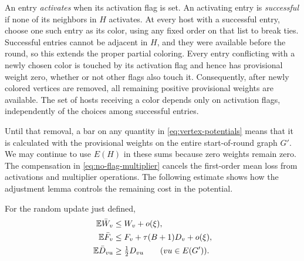 An entry \emph{activates} when its activation flag is set.  An activating
entry is \emph{successful} if none of its neighbors in $H$ activates.
At every host with a successful entry, choose one such entry as its color,
using any fixed order on that list to break ties.  Successful entries
cannot be adjacent in $H$, and they were available before the round,
so this extends the proper partial coloring.  Every entry conflicting
with a newly chosen color is touched by its activation flag and hence
has provisional weight zero, whether or not other flags also touch it.
Consequently, after newly colored vertices are removed, all remaining
positive provisional weights are available.
The set of hosts receiving a color depends only on activation flags,
independently of the choices among successful entries.

Until that removal, a bar on any quantity in
\eqref{eq:vertex-potentials} means that it is calculated with the
provisional weights on the entire start-of-round graph $G'$.  We may
continue to use $E(H)$ in these sums because zero weights remain zero.
The compensation in \eqref{eq:no-flag-multiplier} cancels the
first-order mean loss from activations and multiplier operations.
The following estimate shows how the adjustment lemma controls the
remaining cost in the potential.

\begin{lemma}\label{lem:round-expectation}
For the random update just defined,
\begin{equation}\label{eq:round-expectations}
 \begin{aligned}
 \mathbb E\bar W_v&\le W_v+o(\xi),\\
 \mathbb E\bar F_v&\le F_v+\tau(B+1)D_v+o(\xi),\\
 \mathbb E\bar D_{vu}&\ge\tfrac12D_{vu}\qquad(vu\in E(G')).
 \end{aligned}
\end{equation}
\end{lemma}

